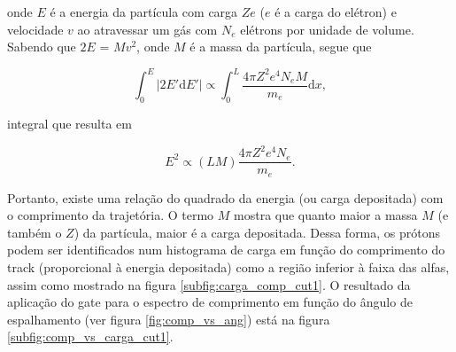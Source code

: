 \documentclass[a4paper,12pt,oneside]{book}
\begin{document}

\par onde $E$ é a energia da partícula com carga $Ze$ ($e$ é a carga do elétron) e velocidade $v$ ao atravessar um gás com $N_e$ elétrons por unidade de volume. Sabendo que $2E$ = $Mv^2$, onde $M$ é a massa da partícula, segue que

\begin{equation}\label{eq:bethe_block_low_energies_2}
	\int^{E}_0 \left | 2E'\mathrm{d}E' \right | \propto \int^{L}_0 \frac{4\pi Z^2  e^4 N_e M}{m_e} \mathrm{d}x,
\end{equation}

\par integral que resulta em

\begin{equation}\label{eq:bethe_block_low_energies_3}
	E^2 \propto (LM)\frac{4\pi Z^2  e^4 N_e}{m_e}.
\end{equation}

\par Portanto, existe uma relação do quadrado da energia (ou carga depositada) com o comprimento da trajetória. O termo $M$ mostra que quanto maior a massa $M$ (e também o $Z$) da partícula, maior é a carga depositada. Dessa forma, os prótons podem ser identificados num histograma de carga em função do comprimento do track (proporcional à energia depositada) como a região inferior à faixa das alfas, assim como mostrado na figura \ref{subfig:carga_comp_cut1}. O resultado da aplicação do gate para o espectro de comprimento em função do ângulo de espalhamento (ver figura \ref{fig:comp_vs_ang}) está na figura \ref{subfig:comp_vs_carga_cut1}.
\end{document}
